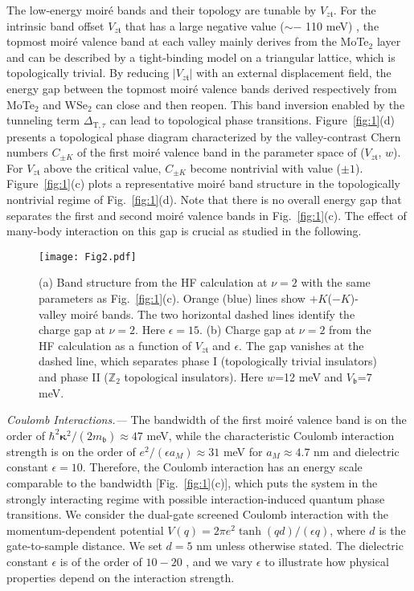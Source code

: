 \documentclass[aps,prl,twocolumn,superscriptaddress,longbibliography]{revtex4-2}
\begin{document}
The low-energy moir\'e bands and their topology are tunable by $V_{z\mathfrak{t}}$. For the intrinsic band offset $V_{z\mathfrak{t}}$ that has a large negative value ($\sim -$ 110 meV) \cite{zhang2021spintextured}, the topmost moir\'e valence band at each valley mainly derives from the MoTe$_2$ layer and can be described by a tight-binding model on a triangular lattice, which is topologically trivial. By reducing $|V_{z\mathfrak{t}}|$ with an external displacement field, the energy gap between the topmost moir\'e valence bands derived respectively from MoTe$_2$ and WSe$_2$ can close and then reopen. This band inversion enabled by the tunneling term  $ \Delta_{\text{T},\tau}$ can lead to topological phase transitions. Figure~\ref{fig:1}(d) presents a topological phase diagram characterized by the valley-contrast Chern numbers $C_{\pm K}$ of the first moir\'e valence band in the parameter space of ($V_{z\mathfrak{t}}$, $w$). For $V_{z\mathfrak{t}}$ above the critical value, $C_{\pm K}$ become nontrivial with value ($\pm 1$). Figure~\ref{fig:1}(c) plots a representative moir\'e band structure in the topologically nontrivial regime of Fig.~\ref{fig:1}(d). Note that there is no overall energy gap that separates the first and second moir\'e valence bands in Fig.~\ref{fig:1}(c). The effect of many-body interaction on this gap is crucial as studied in the following.




\begin{figure}[t]
    \centering
    \texttt{[image: Fig2.pdf]}
    \caption{(a) Band structure from the HF calculation  at $\nu=2$ with the same parameters as Fig.~\ref{fig:1}(c). Orange (blue) lines show $+K$($-K$)-valley moir\'e bands. {The two horizontal dashed lines identify the charge gap at $\nu=2$.} Here $\epsilon=15$. (b) Charge gap at $\nu=2$ from the HF calculation as a function of $V_{z\mathfrak{t}}$ and $\epsilon$.  The gap vanishes at the dashed line, which separates phase I (topologically trivial insulators) and phase II ($\mathbb{Z}_2$ topological insulators). Here $w$=12 meV and $V_\mathfrak{b}$=7 meV.}
    \label{fig:2}
\end{figure}


\textit{Coulomb Interactions.---} The bandwidth of the first moir\'e valence band is on the order of $\hbar^2 \bm{\kappa}^2/(2 m_{\mathfrak{b}}) \approx 47 $ meV, while the characteristic Coulomb interaction strength is on the order of $e^2/(\epsilon a_M) \approx 31 $ meV for $a_M  \approx 4.7 $ nm and dielectric constant $\epsilon= 10 $. Therefore, the Coulomb interaction has an energy scale comparable to the bandwidth [Fig.~\ref{fig:1}(c)], which puts the system in the strongly interacting regime with possible interaction-induced quantum phase transitions. We consider the dual-gate screened Coulomb interaction with the momentum-dependent potential $V(q)=2\pi e^2 \tanh(q d)/(\epsilon q)$, where $d$ is the gate-to-sample distance. We set $d=5$ nm \cite{li2021quantum} unless otherwise stated. The dielectric constant $\epsilon$ is of the order of $10-20$ , and we vary $\epsilon$ to illustrate how physical properties depend on the interaction strength.
\end{document}
